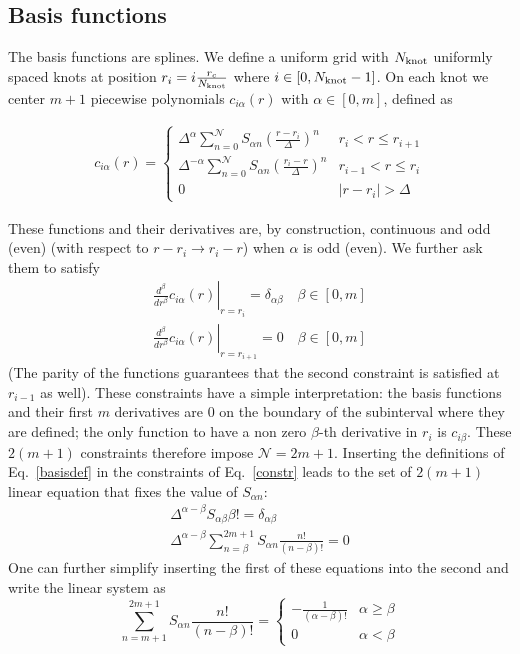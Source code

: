 \subsection{Basis functions}
The basis functions are splines. We define a uniform grid 
with $N_{\text{knot}}$ uniformly spaced knots at position $r_i=i\frac{r_c}{N_{\text{knot}}}$ 
where $i\in[0,N_{\text{knot}}-1]$. On each knot we center $m+1$ piecewise polynomials
$c_{i\alpha}(r)$ with $\alpha\in[0,m]$, defined as
\vskip 3mm
\begin{center}
\begin{eqnarray}
c_{i\alpha}(r)=\begin{cases}
\Delta^\alpha \sum_{n=0}^\mathcal{N} S_{\alpha n}(\frac{r-r_i}{\Delta})^n & r_i<r\le r_{i+1} \\
\Delta^{-\alpha} \sum_{n=0}^\mathcal{N} S_{\alpha n}(\frac{r_i-r}{\Delta})^n & r_{i-1}<r\le r_i \\
0 & |r-r_i| > \Delta
\end{cases}
\label{basisdef}
\end{eqnarray}

\end{center}
\vskip 3mm
These functions and their derivatives are, by construction, continuous and odd (even)
(with respect to $r-r_i\rightarrow r_i-r$) when $\alpha$ is odd (even).
We further ask them to satisfy
\begin{eqnarray}
\left.\frac{d^\beta}{dr^\beta} c_{i\alpha}(r)\right|_{r=r_i}=
\delta_{\alpha\beta} \quad \beta\in[0,m]\\
\left.\frac{d^{\beta}}{dr^{\beta}} c_{i\alpha}(r)\right|_{r=r_{i+1}}=0\quad \beta\in[0,m]
\label{constr}
\end{eqnarray}
(The parity of the functions guarantees that the second constraint is satisfied
at $r_{i-1}$ as well). These constraints have a simple interpretation: the basis functions
and their first $m$ derivatives are $0$ on the boundary of the subinterval where they
are defined; the only function to have a non zero $\beta$-th derivative in $r_i$ is $c_{i\beta}$.
These $2(m+1)$ constraints therefore impose $\mathcal{N}=2m+1$. 
Inserting the definitions of Eq.~\ref{basisdef} in the constraints of Eq.~\ref{constr}
leads to the set of $2(m+1)$ linear equation that fixes the value of $S_{\alpha n}$: 
\begin{eqnarray}
\Delta^{\alpha-\beta} S_{\alpha\beta} \beta!=\delta_{\alpha\beta}
\label{Smatrix1}\\
\Delta^{\alpha-\beta}\sum_{n=\beta}^{2m+1} S_{\alpha n} \frac{n!}{(n-\beta)!}=0
\end{eqnarray}
One can further simplify inserting the first of these equations into the second and write
the linear system as
\begin{equation}
\sum_{n=m+1}^{2m+1} S_{\alpha n} \frac{n!}{(n-\beta)!}=\begin{cases}
-\frac{1}{(\alpha-\beta)!}& \alpha\ge \beta \\
0 & \alpha < \beta
\end{cases}
\label{Smatrix2}
\end{equation}

